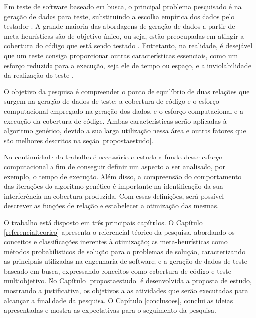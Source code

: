 Em teste de software baseado em busca, o principal problema pesquisado é na geração de dados para teste, substituindo a escolha empírica dos dados pelo testador \cite{mcminn2004search}. A grande maioria das abordagens de geração de dados a partir de meta-heurísticas são de objetivo único, ou seja, estão preocupadas em atingir a cobertura do código que está sendo testado \cite{harman2015achievements}. Entretanto, na realidade, é desejável que um teste consiga proporcionar outras características essenciais, como um esforço reduzido para a execução, seja ele de tempo ou espaço, e a inviolabilidade da realização do teste \cite{harman2015achievements}.

O objetivo da pesquisa é compreender o ponto de equilíbrio de duas relações que surgem na geração de dados de teste: a cobertura de código e o esforço computacional empregado na geração dos dados, e o esforço computacional e a execução da cobertura de código. Ambas características serão aplicadas à algoritmo genético, devido a sua larga utilização nessa área e outros fatores que são melhores descritos na seção \ref{propostaestudo}.

Na continuidade do trabalho é necessário o estudo a fundo desse esforço computacional a fim de conseguir definir um aspecto a ser analisado, por exemplo, o tempo de execução. Além disso, a compreensão do comportamento das iterações do algoritmo genético é importante na identificação da sua interferência na cobertura produzida. Com essas definições, será possível descrever as funções de relação e estabelecer a otimização das mesmas. 

O trabalho está disposto em três principais capítulos. O Capítulo \ref{referencialteorico} apresenta o referencial téorico da pesquisa, abordando os conceitos e classificações inerentes à otimização; as meta-heurísticas como métodos probabílisticos de solução para o problemas de solução, caracterizando as principais utilizadas na engenharia de software; e a geração de dados de teste baseado em busca, expressando conceitos como cobertura de código e teste multiobjetivo. No Capítulo \ref{propostaestudo} é desenvolvida a proposta de estudo, mostrando a justificativa, os objetivos a as atividades que serão executadas para alcançar a finalidade da pesquisa. O Capítulo \ref{conclusoes}, conclui as ideias apresentadas e mostra as expectativas para o seguimento da pesquisa.

 




